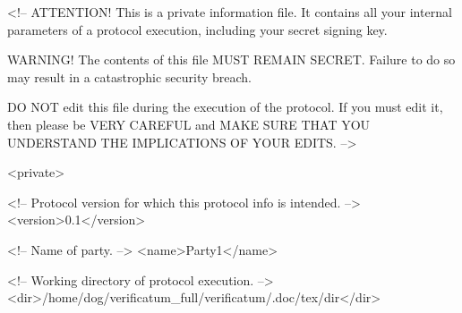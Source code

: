 
<!-- ATTENTION! This is a private information file. It contains all 
     your internal parameters of a protocol execution, including 
     your secret signing key.
     
     WARNING! The contents of this file MUST REMAIN SECRET. Failure 
     to do so may result in a catastrophic security breach.
     
     DO NOT edit this file during the execution of the protocol. If 
     you must edit it, then please be VERY CAREFUL and MAKE SURE 
     THAT YOU UNDERSTAND THE IMPLICATIONS OF YOUR EDITS. -->

<private>

   <!-- Protocol version for which this protocol info is intended. -->
   <version>0.1</version>

   <!-- Name of party. -->
   <name>Party1</name>

   <!-- Working directory of protocol execution. -->
   <dir>/home/dog/verificatum_full/verificatum/.doc/tex/dir</dir>

